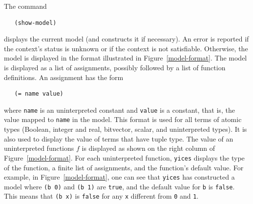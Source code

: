 \documentclass[11pt,twoside,fleqn,openright,titlepage]{cslreport}
\begin{document}
\medskip\noindent
The command
\begin{small}
\begin{verbatim}
   (show-model)
\end{verbatim}
\end{small}
displays the current model (and constructs it if necessary). An error
is reported if the context's status is unknown or if the context is
not satisfiable. Otherwise, the model is displayed in the format
illustrated in Figure~\ref{model-format}. The model is displayed as a
list of assignments, possibly followed by a list of function
definitions. An assignment has the form
\begin{small}
\begin{verbatim}
   (= name value)
\end{verbatim}
\end{small}
where \texttt{name} is an uninterpreted constant and
\texttt{value} is a constant, that is, the value mapped to
\texttt{name} in the model. This format is used for all terms of
atomic types (Boolean, integer and real, bitvector, scalar, and
uninterpreted types). It is also used to display the value of terms
that have tuple type. The value of an uninterpreted functions $f$ is
displayed as shown on the right column of Figure~\ref{model-format}.
For each uninterpreted function, \texttt{yices} displays the type of
the function, a finite list of assignments, and the function's default
value. For example, in Figure~\ref{model-format}, one can see that
\texttt{yices} has constructed a model where \texttt{(b 0)} and
\texttt{(b 1)} are \texttt{true}, and the default value for \texttt{b}
is \texttt{false}.  This means that \texttt{(b x)} is \texttt{false}
for any \texttt{x} different from \texttt{0} and \texttt{1}.
\end{document}
